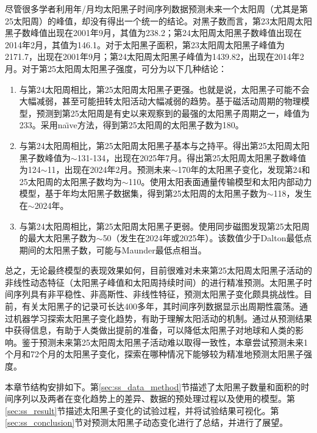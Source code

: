尽管很多学者利用年/月均太阳黑子时间序列数据预测未来一个太阳周（尤其是第25太阳周）的峰值，却没有得出一个统一的结论。对黑子数而言，第23太阳周太阳黑子数峰值出现在2001年9月，其值为238.2；第24太阳周太阳黑子数峰值出现在2014年2月，其值为146.1。对于太阳黑子面积，第23太阳周太阳黑子峰值为2171.7，出现在2001年9月；第24太阳周太阳黑子峰值为1439.82，出现在2014年2月。对于第25太阳周太阳黑子强度，可分为以下几种结论：
\begin{enumerate}
  \item 与第24太阳周相比，第25太阳周太阳黑子更强。也就是说，太阳黑子可能不会大幅减弱，甚至可能扭转太阳活动大幅减弱的趋势。\citet{mcintosh2020overlapping}基于磁活动周期的物理模型，预测到第25太阳周是有史以来观察到的最强的太阳黑子周期之一，峰值为233。\citet{pesnell2018effects}采用na{\"\i}ve方法，得到第25太阳周的太阳黑子数为180。
  \item 与第24太阳周相比，第25太阳周太阳黑子基本与之持平。\citet{bisoi2020another}得出第25太阳周太阳黑子数峰值为$\sim$131-134，出现在2025年7月。\citet{singh2019prediction}得出第25太阳周太阳黑子数峰值为124$\sim$11，出现在2024年2月。\citet{hiremath2008prediction}预测未来$\sim$170年的太阳黑子变化，发现第24和25太阳周的太阳黑子数均为$\sim$110。\citet{bhowmik2018prediction}使用太阳表面通量传输模型和太阳内部动力模型，基于年均太阳黑子数据集，得到第25太阳周的太阳黑子数为$\sim$118，发生在$\sim$2024年。
  \item 与第24太阳周相比，第25太阳周太阳黑子更弱。\citep{kitiashvili2020application}使用同步磁图发现第25太阳周的最大太阳黑子数为$\sim$50（发生在2024年或2025年）。该数值少于Dalton最低点期间的太阳黑子数，可能与Maunder最低点相当。
\end{enumerate}

总之，无论最终模型的表现效果如何，目前很难对未来第25太阳周太阳黑子活动的非线性动态特征（太阳黑子峰值和太阳周持续时间）的进行精准预测。太阳黑子时间序列具有非平稳性、非高斯性、非线性特征，预测太阳黑子变化颇具挑战性。目前，有关太阳黑子的记录可长达400多年，其时间序列数据显示出周期性震荡。通过机器学习探索太阳黑子变化趋势，有助于理解太阳活动的机制。通过从预测结果中获得信息，有助于人类做出提前的准备，可以降低太阳黑子对地球和人类的影响。鉴于预测未来第25太阳周太阳黑子活动难以取得一致性，本章尝试预测未来1个月和72个月的太阳黑子变化，探索在哪种情况下能够较为精准地预测太阳黑子强度。

本章节结构安排如下。第\ref{sec:ss_data_method}节描述了太阳黑子数量和面积的时间序列以及两者在变化趋势上的差异、数据的预处理过程以及使用的模型。第\ref{sec:ss_result}节描述太阳黑子变化的试验过程，并将试验结果可视化。第\ref{sec:ss_conclusion}节对预测太阳黑子动态变化进行了总结，并进行了展望。

